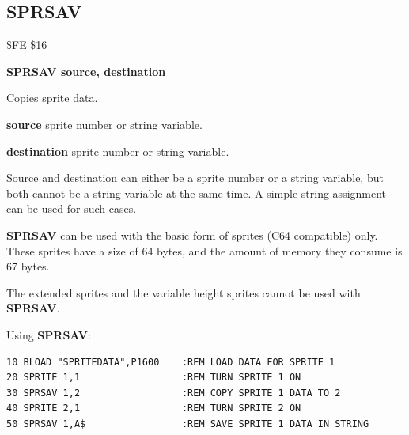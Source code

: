 
\newpage
\subsection{SPRSAV}
\begin{description}[leftmargin=2cm,style=nextline]
\item [Token:] \$FE \$16
\item [Format:] {\bf SPRSAV source, destination}
\item [Usage:]  Copies sprite data.

                {\bf source} sprite number or string variable.

                {\bf destination} sprite number or string variable.

\item [Remarks:] Source and destination can either be
                a sprite number or a string variable,
                but both cannot be a string variable at the same time.
                A simple string assignment can be used for such
                cases.

                {\bf SPRSAV} can be used with the basic form of sprites
                (C64 compatible) only. These sprites have a size of 64 bytes,
                and the amount of memory they consume is 67 bytes.

                The extended sprites and the variable height sprites
                cannot be used with {\bf SPRSAV}.

\item [Example:] Using {\bf SPRSAV}:
\begin{tcolorbox}[colback=black,coltext=white]
\verbatimfont{\codefont}
\begin{verbatim}
10 BLOAD "SPRITEDATA",P1600    :REM LOAD DATA FOR SPRITE 1
20 SPRITE 1,1                  :REM TURN SPRITE 1 ON
30 SPRSAV 1,2                  :REM COPY SPRITE 1 DATA TO 2
40 SPRITE 2,1                  :REM TURN SPRITE 2 ON
50 SPRSAV 1,A$                 :REM SAVE SPRITE 1 DATA IN STRING
\end{verbatim}
\end{tcolorbox}
\end{description}


\newpage
